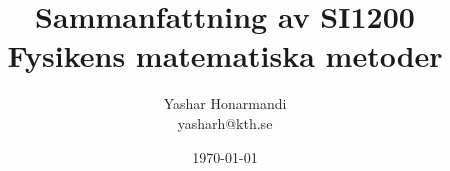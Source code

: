 \documentclass[a4paper, 11pt]{article}
\title{Sammanfattning av SI1200 Fysikens matematiska metoder}
\author{Yashar Honarmandi \\ yasharh@kth.se}
\date{\today}
\begin{document}
\maketitle

\begin{abstract}
	
\end{abstract}

\thispagestyle{empty}

\newpage

\tableofcontents

\newpage









\end{document}
